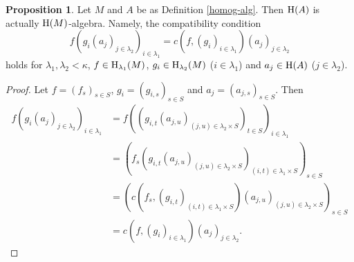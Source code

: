 \documentclass[a4paper,10pt]{article}
\theoremstyle{definition}
\newtheorem{prop}[df]{Proposition}
\begin{document}
\begin{prop}
Let $M$ and $A$ be as Definition \ref{homog-alg}.
Then ${\rm H}(A)$ is actually ${\rm H}(M)$-algebra. Namely,
the compatibility condition 
\[
f(g_i(a_j)_{j\in\lambda_2})_{i\in\lambda_1}
=c(f,(g_i)_{i\in \lambda_1})(a_j)_{j\in\lambda_2}
\]
holds for $\lambda_1,\lambda_2<\kappa$, $f\in {\rm H}_{\lambda_1}(M)$,
$g_i\in{\rm H}_{\lambda_2}(M)$ ($i\in \lambda_1$) and
$a_j\in {\rm H}(A)$ ($j\in \lambda_2$).
\end{prop}
\begin{proof}
Let $f=(f_s)_{s\in S}$, $g_i=(g_{i,s})_{s\in S}$ and $a_j=(a_{j,s})_{s\in S}$.
Then
\begin{align*}
f(g_i(a_j)_{j\in\lambda_2})_{i\in\lambda_1}
&=f((g_{i,t}(a_{j,u})_{(j,u)\in\lambda_2\times S})_{t\in S})_{i\in\lambda_1}\\
&=(f_s(g_{i,t}(a_{j,u})_{(j,u)\in\lambda_2\times S})
  _{(i,t)\in\lambda_1\times S})_{s\in S}\\
&=(c(f_s,(g_{i,t})_{(i,t)\in\lambda_1\times S})
  (a_{j,u})_{(j,u)\in\lambda_2\times S})_{s\in S}\\
&=c(f,(g_i)_{i\in \lambda_1})(a_j)_{j\in\lambda_2}.
\end{align*}
\end{proof}
\end{document}
